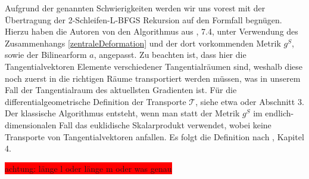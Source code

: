 Aufgrund der genannten Schwierigkeiten werden wir uns vorest mit der Übertragung der 2-Schleifen-L-BFGS Rekursion auf den Formfall begnügen. Hierzu haben die Autoren von \cite{bfgs1} den Algorithmus aus \cite{Nocedal}, 7.4, unter Verwendung des Zusammenhangs \ref{zentraleDeformation} und der dort vorkommenden Metrik $g^S$, sowie der Bilinearform $a$, angepasst. Zu beachten ist, dass hier die Tangentialvektoren Elemente verschiedener Tangentialräumen sind, weshalb diese noch zuerst in die richtigen Räume transportiert werden müssen, was in unserem Fall der Tangentialraum des aktuellsten Gradienten ist. Für die differentialgeometrische Definition der Transporte $\mathcal{T}$, siehe etwa \cite{LeeDGEO} oder \cite{diffusion} Abschnitt 3. Der klassische Algorithmus entsteht, wenn man statt der Metrik $g^S$ im endlich-dimensionalen Fall das euklidische Skalarprodukt verwendet, wobei keine Transporte von Tangentialvektoren anfallen. Es folgt die Definition nach \cite{bfgs1}, Kapitel 4.

\colorbox{red}{ achtung: länge l oder länge m oder was genau}

